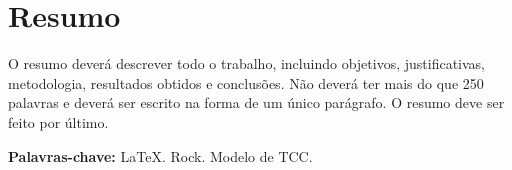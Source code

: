 \chapter*{Resumo} \thispagestyle{empty}

O resumo deverá descrever todo o trabalho, incluindo objetivos, justificativas, metodologia, resultados 
obtidos e conclusões. Não deverá ter mais do que 250 palavras e deverá ser escrito na forma de um único 
parágrafo. O resumo deve ser feito por último.


\smallskip
\noindent \textbf {Palavras-chave: } {LaTeX. Rock. Modelo de TCC. } %
